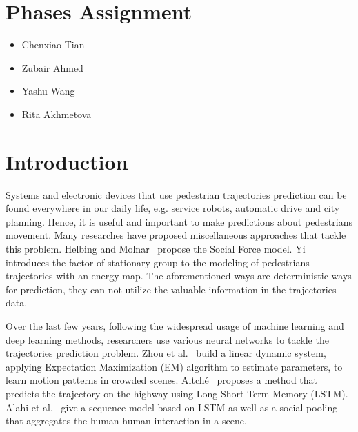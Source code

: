 \documentclass[sigconf]{acmart}
\begin{document}
\maketitle
\section*{Phases Assignment}
\begin{itemize}
    \item {} Chenxiao Tian
    \item {} Zubair Ahmed
    \item {} Yashu Wang
    \item {} Rita Akhmetova
\end{itemize}
\section*{Introduction}

Systems and electronic devices that use pedestrian trajectories prediction can be found everywhere in our daily life, e.g. service robots, automatic drive and city planning. Hence, it is useful and important to make predictions about pedestrians movement. Many researches have proposed miscellaneous approaches that tackle this problem. Helbing and Molnar~\cite{Helbing95} propose the Social Force model. Yi~\cite{Yi15} introduces the factor of stationary group to the modeling of pedestrians trajectories with an energy map. The aforementioned ways are deterministic ways for prediction, they can not utilize the valuable information in the trajectories data.

Over the last few years, following the widespread usage of machine learning and deep learning methods, researchers use various neural networks to tackle the trajectories prediction problem. Zhou et al.~\cite{Zhou} build a linear dynamic system, applying Expectation Maximization (EM) algorithm to estimate parameters, to learn motion patterns in crowded scenes. Altché~\cite{Altche17} proposes a method that predicts the trajectory on the highway using Long Short-Term Memory (LSTM). Alahi et al.~\cite{Alahi16} give a sequence model based on LSTM as well as a social pooling that aggregates the human-human interaction in a scene.
\end{document}
